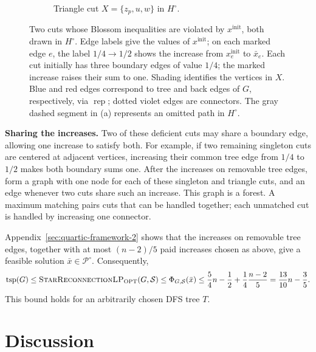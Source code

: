 \documentclass[11pt]{amsart}
\newcommand{\1}{\mathbbm{1}}
\newcommand{\LPtwo}{\textsc{StarReconnectionLP}}
\begin{document}
\begin{figure}[!t]
\begin{subfigure}[t]{.51\textwidth}
\caption{Triangle cut $X=\{z_p,u,w\}$ in $H^\circ$.}
\label{proc:fig-quartic-cuts}
\end{subfigure}

\caption{Two cuts whose Blossom inequalities are violated by
$x^{\mathrm{init}}$, both drawn in $H^\circ$.
Edge labels give the values of $x^{\mathrm{init}}$; on each
marked edge $e$, the label $1/4\to1/2$ shows the increase
from $x^{\mathrm{init}}_e$ to $\bar x_e$.
Each cut initially has three boundary edges of value $1/4$;
the marked increase raises their sum to one.
Shading identifies the vertices in $X$.
Blue and red edges correspond to tree and back edges of $G$,
respectively, via $\operatorname{rep}$; dotted violet edges are connectors.
The gray dashed segment in (a) represents an omitted path
in $H^\circ$.}
\label{proc:quartic-cut-configurations}
\end{figure}

\smallskip\noindent\textbf{Sharing the increases.}
{Two of these deficient cuts may share a boundary edge, allowing one
increase to satisfy both. For example, if two remaining singleton
cuts are centered at adjacent vertices, increasing their common
tree edge from $1/4$ to $1/2$ makes both boundary sums one.
After the increases on removable tree edges, form a graph with one node for each of these
singleton and triangle cuts, and an edge whenever two cuts share
such an increase.
This graph is a forest. A maximum matching pairs cuts that can be
handled together; each unmatched cut is handled by increasing one
connector.}

Appendix~\ref{sec:quartic-framework-2} shows that the increases
on removable tree edges, together with at most $(n-2)/5$ paid
increases chosen as above, give a feasible solution
$\bar x\in{\mathcal P^\circ}$.
Consequently,
\[
 \operatorname{tsp}(G)\le\text{\LPtwo}_{\mathrm{OPT}}(G,\mathcal S)
 \le\Phi_{G,\mathcal S}(\bar x)
 \le\frac54n-\frac12+\frac14\frac{n-2}{5}
 =\frac{13}{10}n-\frac35.
\]
This bound holds for an arbitrarily chosen DFS tree $T$.

\section{Discussion}
\end{document}
